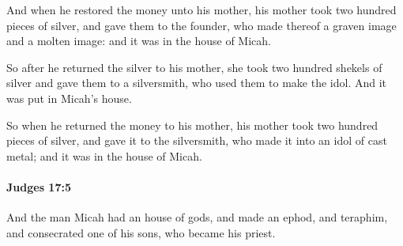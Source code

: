 			\begin{versebox}
					\item[BHS] 
					\item[ASV] And when he restored the money unto his mother, his mother took two hundred pieces of silver, and gave them to the founder, who made thereof a graven image and a molten image: and it was in the house of Micah.
					\item[NIV] So after he returned the silver to his mother, she took two hundred shekels of silver and gave them to a silversmith, who used them to make the idol. And it was put in Micah’s house.
					\item[NRSV] So when he returned the money to his mother, his mother took two hundred pieces of silver, and gave it to the silversmith, who made it into an idol of cast metal; and it was in the house of Micah.
			\end{versebox}

		\paragraph{Judges 17:5} %
			\label{JUDGES-17-5}

			And the man Micah had an house of gods, and made an ephod, and teraphim, and consecrated one of his sons, who became his priest.

